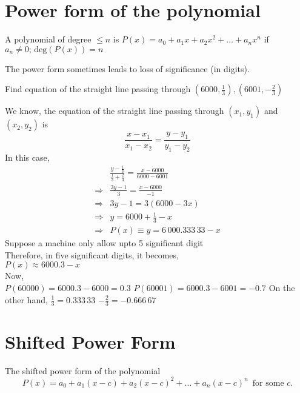 \documentclass[12pt,class=book,crop=false]{standalone}
\begin{document}
\section{Power form of the polynomial}
A polynomial of degree \(  \leq n \) is \(  P(x)=a_0+a_1x+a_2x^2+\dots+a_nx^n \) if \(  a_n \neq 0 \text{; deg}(P(x))=n\)
\begin{rem}
    The power form sometimes leads to loss of significance (in digits).
\end{rem}
\begin{prob}
    Find equation of the straight line passing through \(  (6000,\frac{1}{3}),(6001,-\frac{2}{3}) \)
\end{prob}
\begin{soln}
    We know, the equation of the straight line passing through \(  (x_1,y_1) \) and \(  (x_2,y_2) \) is\[\frac{x-x_1}{x_1-x_2}=\frac{y-y_1}{y_1-y_2}\]
    In this case,
    \begin{align*}
                    & \frac{y-\frac{1}{3}}{\frac{1}{3}+\frac{2}{3}}=\frac{x-6000}{6000-6001} \\
        \Rightarrow & \frac{3y-1}{3} =\frac{x-6000}{-1}                                      \\
        \Rightarrow & 3y-1 = 3(6000-3x)                                                      \\
        \Rightarrow & y = 6000+\frac{1}{3}-x                                                 \\
        \Rightarrow & P(x) \equiv y=6\,000.333\,33-x
    \end{align*}
    Suppose a machine only allow upto 5 significant digit\\
    Therefore, in five significant digits, it becomes,\\
    \indent \(  P(x)\approx 6000.3-x \)\\
    Now,\\
    \indent \(  P(60000)=6000.3-6000=0.3 \)
    \indent \(  P(60001)=6000.3-6001=-0.7 \)
    On the other hand,
    \indent\(  \frac{1}{3}=0.333\,33 \)
    \indent\(  -\frac{2}{3}=-0.666\,67 \)
\end{soln}
\section{Shifted Power Form}
The shifted power form of the polynomial
\begin{equation}
    P(x)=a_0+a_1(x-c)+a_2(x-c)^2+\dots+a_n(x-c)^n  \,\text{  for some } c . \label{eq:shift}
\end{equation}
\end{document}
